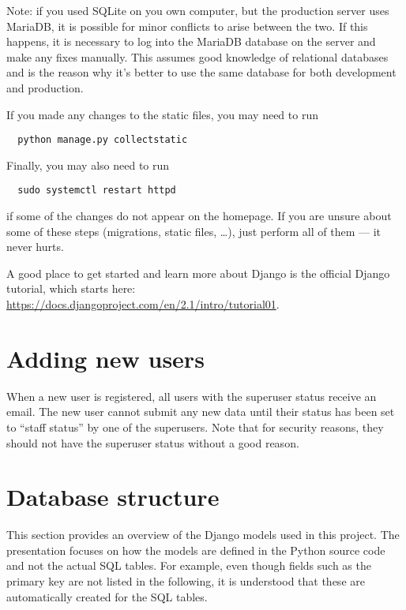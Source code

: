 \documentclass{article}
\begin{document}
Note: if you used SQLite on you own computer, but the production server uses MariaDB, it is possible for minor conflicts to arise between the two. If this happens, it is necessary to log into the MariaDB database on the server and make any fixes manually. This assumes good knowledge of relational databases and is the reason why it's better to use the same database for both development and production.

If you made any changes to the static files, you may need to run
\begin{lstlisting}
  python manage.py collectstatic
\end{lstlisting}
Finally, you may also need to run
\begin{lstlisting}
  sudo systemctl restart httpd
\end{lstlisting}
if some of the changes do not appear on the homepage. If you are unsure about some of these steps (migrations, static files, \ldots), just perform all of them --- it never hurts.

A good place to get started and learn more about Django is the official Django tutorial, which starts here: \url{https://docs.djangoproject.com/en/2.1/intro/tutorial01}.

\section{Adding new users}

When a new user is registered, all users with the superuser status receive an email. The new user cannot submit any new data until their status has been set to ``staff status'' by one of the superusers. Note that for security reasons, they should not have the superuser status without a good reason.

\section{Database structure}

This section provides an overview of the Django models used in this project. The presentation focuses on how the models are defined in the Python source code and not the actual SQL tables. For example, even though fields such as the primary key are not listed in the following, it is understood that these are automatically created for the SQL tables.
\end{document}
